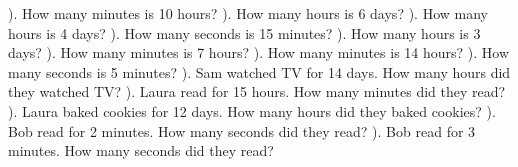\documentclass{article}%
\begin{document}
\newline%
). How many minutes is 10 hours?%
\newline%
\newline%
). How many hours is 6 days?%
\newline%
\newline%
). How many hours is 4 days?%
\newline%
\newline%
). How many seconds is 15 minutes?%
\newline%
\newline%
). How many hours is 3 days?%
\newline%
\newline%
). How many minutes is 7 hours?%
\newline%
\newline%
). How many minutes is 14 hours?%
\newline%
\newline%
). How many seconds is 5 minutes?%
\newline%
\newline%
). Sam watched TV for 14 days. How many hours did they watched TV?%
\newline%
\newline%
). Laura read for 15 hours. How many minutes did they read?%
\newline%
\newline%
). Laura baked cookies for 12 days. How many hours did they baked cookies?%
\newline%
\newline%
). Bob read for 2 minutes. How many seconds did they read?%
\newline%
\newline%
). Bob read for 3 minutes. How many seconds did they read?%
\newline%
\newline%
\end{document}
